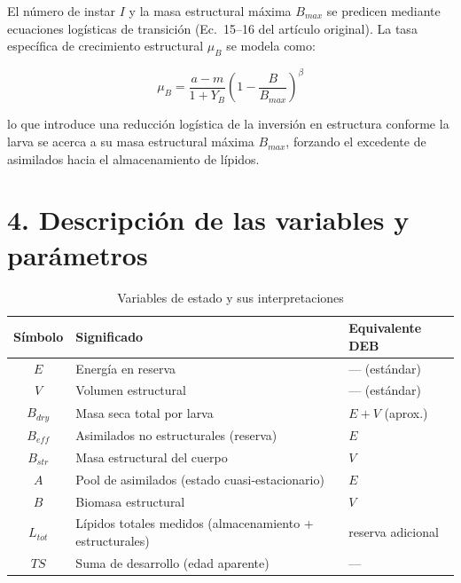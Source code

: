 \documentclass[11pt,a4paper]{article}
\begin{document}
El número de instar $I$ y la masa estructural máxima $B_{max}$ se predicen mediante ecuaciones logísticas de transición (Ec.\ 15--16 del artículo original). La tasa específica de crecimiento estructural $\mu_B$ se modela como:

\begin{equation}
    \mu_B = \frac{a-m}{1+Y_B}\left(1 - \frac{B}{B_{max}}\right)^\beta
    \label{eq:plos_muB}
\end{equation}

lo que introduce una reducción logística de la inversión en estructura conforme la larva se acerca a su masa estructural máxima $B_{max}$, forzando el excedente de asimilados hacia el almacenamiento de lípidos.

\section{4. Descripción de las variables y parámetros}

\begin{table}[htbp]
\centering
\caption{Variables de estado y sus interpretaciones}
\begin{tabular}{@{}cll@{}}
\toprule
\textbf{Símbolo} & \textbf{Significado} & \textbf{Equivalente DEB} \\
\midrule
$E$ & Energía en reserva & --- (estándar) \\
$V$ & Volumen estructural & --- (estándar) \\
$B_{dry}$ & Masa seca total por larva & $E+V$ (aprox.) \\
$B_{eff}$ & Asimilados no estructurales (reserva) & $E$ \\
$B_{str}$ & Masa estructural del cuerpo & $V$ \\
$A$ & Pool de asimilados (estado cuasi-estacionario) & $E$ \\
$B$ & Biomasa estructural & $V$ \\
$L_{tot}$ & Lípidos totales medidos (almacenamiento + estructurales) & reserva adicional \\
$TS$ & Suma de desarrollo (edad aparente) & --- \\
\bottomrule
\end{tabular}
\end{table}
\end{document}
